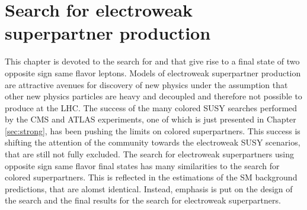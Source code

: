 \chapter{Search for electroweak superpartner production}\label{sec:ewk}
\noindent
\justify
This chapter is devoted to the search for \firstcharg\PSGczDt and \PSGczDo\PSGczDo that give rise to a final state of two opposite sign same flavor leptons. 
Models of electroweak superpartner production are attractive avenues for discovery of new physics under the assumption that other new physics particles are heavy and decoupled and therefore not possible to produce at the LHC.  
The success of the many colored SUSY searches performed by the CMS and ATLAS experiments, one of which is just presented in Chapter \ref{sec:strong}, has been pushing the limits on colored superpartners. 
This success is shifting the attention of the community towards the electroweak SUSY scenarios, that are still not fully excluded. 
The search for electroweak superpartners using opposite sign same flavor final states has many similarities to the search for colored superpartners. 
This is reflected in the estimations of the SM background predictions, that are alomst identical. 
Instead, emphasis is put on the design of the search and the final results for the search for electroweak superpartners.
\newpage
